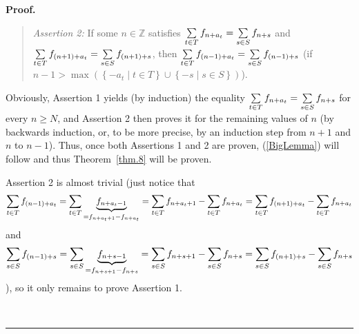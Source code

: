 \documentclass[numbers=enddot,12pt,final,onecolumn,notitlepage]{scrartcl}%
\numberwithin{exer}{section}
\theoremstyle{definition}
\newenvironment{statement}{\begin{quote}}{\end{quote}}
\newenvironment{proof}[1][Proof]{\noindent\textbf{#1.} }{\ \rule{0.5em}{0.5em}}
\let\sumnonlimits\sum
\renewcommand{\sum}{\sumnonlimits\limits}
\begin{document}
\begin{proof}
\begin{statement}
\textit{Assertion 2:} If some $n\in\mathbb{Z}$ satisfies $\sum\limits_{t\in
T}f_{n+a_{t}}=\sum\limits_{s\in S}f_{n+s}$ and $\sum\limits_{t\in T}f_{\left(
n+1\right)  +a_{t}}=\sum\limits_{s\in S}f_{\left(  n+1\right)  +s}$, then
$\sum\limits_{t\in T}f_{\left(  n-1\right)  +a_{t}}=\sum\limits_{s\in
S}f_{\left(  n-1\right)  +s}$ (if \newline$n-1>\max\left(  \left\{  -a_{t}\mid
t\in T\right\}  \cup\left\{  -s\mid s\in S\right\}  \right)  $).
\end{statement}

Obviously, Assertion 1 yields (by induction) the equality $\sum\limits_{t\in
T}f_{n+a_{t}}=\sum\limits_{s\in S}f_{n+s}$ for every $n\geq N$, and Assertion
2 then proves it for the remaining values of $n$ (by backwards induction, or,
to be more precise, by an induction step from $n+1$ and $n$ to $n-1$). Thus,
once both Assertions 1 and 2 are proven, (\ref{BigLemma}) will follow and thus
Theorem~\ref{thm.8} will be proven.

Assertion 2 is almost trivial (just notice that%
\[
\sum\limits_{t\in T}f_{\left(  n-1\right)  +a_{t}}=\sum\limits_{t\in
T}\underbrace{f_{n+a_{t}-1}}_{=f_{n+a_{t}+1}-f_{n+a_{t}}}=\sum\limits_{t\in
T}f_{n+a_{t}+1}-\sum\limits_{t\in T}f_{n+a_{t}}=\sum\limits_{t\in T}f_{\left(
n+1\right)  +a_{t}}-\sum\limits_{t\in T}f_{n+a_{t}}%
\]
and%
\[
\sum\limits_{s\in S}f_{\left(  n-1\right)  +s}=\sum\limits_{s\in
S}\underbrace{f_{n+s-1}}_{=f_{n+s+1}-f_{n+s}}=\sum\limits_{s\in S}%
f_{n+s+1}-\sum\limits_{s\in S}f_{n+s}=\sum\limits_{s\in S}f_{\left(
n+1\right)  +s}-\sum\limits_{s\in S}f_{n+s}%
\]
), so it only remains to prove Assertion 1.


\end{proof}
\end{document}
